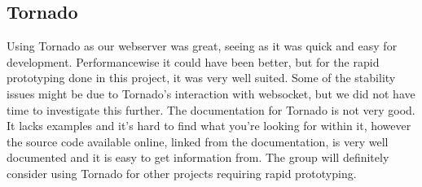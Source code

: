 \subsection{Tornado}
Using Tornado as our webserver was great, seeing as it was quick and easy for development. Performancewise it could have been
better, but for the rapid prototyping done in this project, it was very well suited. Some of the stability issues might be due
to Tornado's interaction with websocket, but we did not have time to investigate this further. The documentation for Tornado
is not very good. It lacks examples and it's hard to find what you're looking for within it, however the source code available
online, linked from the documentation, is very well documented and it is easy to get information from.
The group will definitely consider using Tornado for other projects requiring rapid prototyping.